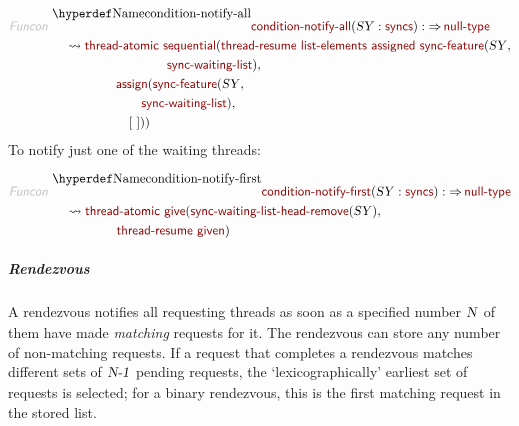 \begin{align*}
  \KEY{Funcon} ~ 
  & \NAMEDECL{condition-notify-all}(\VAR{SY} : \NAME{syncs}) :  \TO \NAME{null-type} \\
  & \quad \leadsto \NAME{thread-atomic} ~
                     \NAME{sequential}
                       ( \NAME{thread-resume} ~
                           \NAME{list-elements} ~
                             \NAME{assigned} ~
                               \NAME{sync-feature}
                                 ( \VAR{SY}, \\&\quad \quad \quad \quad \quad \quad \quad \quad \quad 
                                   \NAME{sync-waiting-list} ), \\&\quad \quad \quad \quad \quad 
                         \NAME{assign}
                           ( \NAME{sync-feature}
                               ( \VAR{SY}, \\&\quad \quad \quad \quad \quad \quad \quad 
                                 \NAME{sync-waiting-list} ), \\&\quad \quad \quad \quad \quad \quad 
                             [  ~  ] ) )
\end{align*}
To notify just one of the waiting threads:

\begin{align*}
  \KEY{Funcon} ~ 
  & \NAMEDECL{condition-notify-first}(\VAR{SY} : \NAME{syncs}) :  \TO \NAME{null-type} \\
  & \quad \leadsto \NAME{thread-atomic} ~
                     \NAME{give}
                       ( \NAME{sync-waiting-list-head-remove}
                           ( \VAR{SY} ), \\&\quad \quad \quad \quad \quad 
                         \NAME{thread-resume} ~
                           \NAME{given} )
\end{align*}
\subparagraph*{Rendezvous}\hypertarget{rendezvous}{}\label{rendezvous}

A rendezvous notifies all requesting threads as soon as a specified number $\SHADE{\VAR{N}}$
of them have made \emph{matching} requests for it. The rendezvous can store any number
of non-matching requests. If a request that completes a rendezvous matches
different sets of $\SHADE{\VAR{N-1}}$ pending requests, the {}`lexicographically{}' earliest set
of requests is selected; for a binary rendezvous, this is the first matching
request in the stored list.

